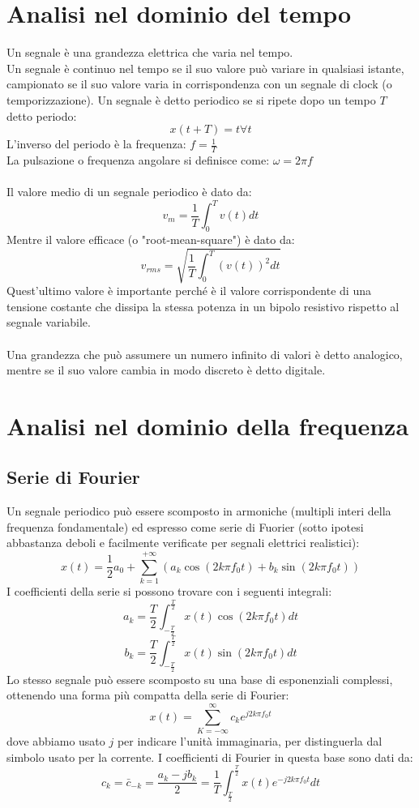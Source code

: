 \documentclass{article}
\begin{document}
\section{Analisi nel dominio del tempo}
Un segnale è una grandezza elettrica che varia nel tempo.\\
Un segnale è continuo nel tempo se il suo valore può variare in qualsiasi istante, campionato se il suo valore varia in corrispondenza con un segnale di clock (o temporizzazione).
Un segnale è detto periodico se si ripete dopo un tempo $T$ detto periodo:
$$ x(t+T)=t \forall t $$
L'inverso del periodo è la frequenza: $f=\frac{1}{T}$\\
La pulsazione o frequenza angolare si definisce come: $\omega=2\pi f$\\\\
Il valore medio di un segnale periodico è dato da:
$$ v_m=\frac{1}{T}\int_0^Tv(t)dt $$
Mentre il valore efficace (o "root-mean-square") è dato da:
$$ v_{rms} = \sqrt{\frac{1}{T}\int_0^T(v(t))^2dt}$$
Quest'ultimo valore è importante perché è il valore corrispondente di una tensione costante che dissipa la stessa potenza in un bipolo resistivo rispetto al segnale variabile.\\\\
Una grandezza che può assumere un numero infinito di valori è detto analogico, mentre se il suo valore cambia in modo discreto è detto digitale.

\section{Analisi nel dominio della frequenza}
\subsection{Serie di Fourier}
Un segnale periodico può essere scomposto in armoniche (multipli interi della frequenza fondamentale) ed espresso come serie di Fuorier (sotto ipotesi abbastanza deboli e facilmente verificate per segnali elettrici realistici):
$$ x(t) = \frac{1}{2}a_0+\sum_{k=1}^{+\infty}(a_k\cos(2k\pi f_0t)+ b_k\sin(2k\pi f_0t)) $$
I coefficienti della serie si possono trovare con i seguenti integrali:
$$ a_k = \frac{T}{2}\int_{-\frac{T}{2}}^{\frac{T}{2}}x(t)\cos(2k\pi f_0t)dt $$
$$ b_k = \frac{T}{2}\int_{-\frac{T}{2}}^{\frac{T}{2}}x(t)\sin(2k\pi f_0t)dt $$
Lo stesso segnale può essere scomposto su una base di esponenziali complessi, ottenendo una forma più compatta della serie di Fourier:
$$ x(t) = \sum_{K=-\infty}^{\infty}c_ke^{j2k\pi f_0t} $$
dove abbiamo usato $j$ per indicare l'unità immaginaria, per distinguerla dal simbolo usato per la corrente. I coefficienti di Fourier in questa base sono dati da:
$$ c_k=\bar{c}_{-k}=\frac{a_k-jb_k}{2}=\frac{1}{T}\int_{\frac{T}{2}}^{\frac{T}{2}}x(t)e^{-j2k\pi f_0t}dt $$
\end{document}
